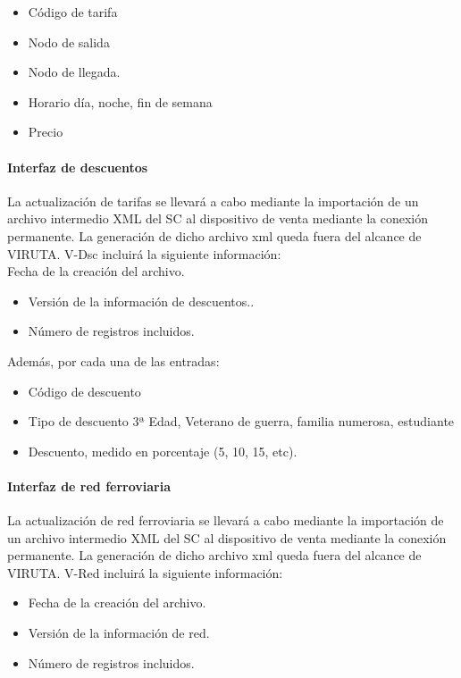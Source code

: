 \begin{itemize}
\item Código de tarifa
\item Nodo de salida
\item Nodo de llegada.
\item Horario {día, noche, fin de semana}
\item Precio
\end{itemize}

\paragraph{Interfaz de descuentos}

La actualización de tarifas se llevará a cabo mediante la importación de un archivo intermedio XML del SC al dispositivo de venta mediante la conexión permanente. La generación de dicho archivo xml queda fuera del alcance de VIRUTA. V-Dsc incluirá la siguiente información:\\

Fecha de la creación del archivo.

\begin{itemize}
 \item Versión de la información de descuentos..
 \item  Número de registros incluidos.
\end{itemize}
Además, por cada una de las entradas:

\begin{itemize}
\item Código de descuento
\item Tipo de descuento { 3ª Edad, Veterano de guerra, familia numerosa, estudiante}
\item Descuento, medido en porcentaje (5, 10, 15, etc).
\end{itemize}

\paragraph{Interfaz de red ferroviaria}

La actualización de red ferroviaria se llevará a cabo mediante la importación de un archivo intermedio XML del SC al dispositivo de venta mediante la conexión permanente. La generación de dicho archivo xml queda fuera del alcance de VIRUTA. V-Red incluirá la siguiente información:\\

\begin{itemize}
 \item Fecha de la creación del archivo.
 \item  Versión de la información de red.
 \item Número de registros incluidos.
\end{itemize}

